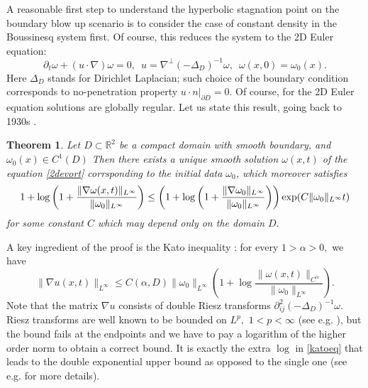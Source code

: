 \documentclass[reqno,centertags, 11pt]{amsart}
\newtheorem{theorem}{Theorem}[section]
\def \Rm {\mathbb R}
\begin{document}
A reasonable first step to understand the hyperbolic stagnation point on the boundary blow up scenario is to consider the case of constant
density in the Boussinesq system first. Of course, this reduces the system to the 2D Euler equation:
\begin{equation}\label{2devort}
\partial_t \omega + (u \cdot \nabla) \omega =0, \,\,\,u = \nabla^\perp(-\Delta_D)^{-1}\omega, \,\,\,\omega(x,0)= \omega_0(x).
\end{equation}
Here $\Delta_D$ stands for Dirichlet Laplacian; such choice of the boundary condition corresponds to no-penetration property $\left. u \cdot n \right|_{\partial D} =0.$
Of course, for the 2D Euler equation solutions are globally regular.
Let us state this result, going back to 1930s \cite{Wolibner,Holder}.
\begin{theorem}\label{upperb}
Let $D \subset \Rm^2$ be a compact domain with smooth boundary, and $\omega_0(x) \in C^1(D)$%
Then there exists a unique smooth solution $\omega(x,t)$ of the equation \eqref{2devort} corrsponding to the initial data $\omega_0$, which moreover satisfies
\begin{equation}\label{upperdexp}
1+\log\left(1+\frac{\|\nabla \omega(x,t)\|_{L^\infty}}{\|\omega_0\|_{L^\infty}}\right) \leq
\left(
1+\log\left(
1+
{
\|\nabla\omega_0\|_{L^\infty}
\over
\|\omega_0\|_{L^\infty}
}
\right)
\right)
\exp(
C\|\omega_0\|_{L^\infty}t
)
\end{equation}
for some constant $C$ which may depend only on the domain $D.$
\end{theorem}

A key ingredient of the proof is the Kato inequality \cite{Kato}: for every $1>\alpha>0,$ we have
\begin{equation}\label{katoeq}
\|\nabla u(x,t)\|_{L^\infty} \leq C(\alpha,D) \|\omega_0\|_{L^\infty}\left(1+\log \frac{\|\omega(x,t)\|_{C^\alpha}}{\|\omega_0\|_{L^\infty}} \right).
\end{equation}
Note that the matrix $\nabla u$ consists of double Riesz transforms $\partial^2_{ij}(-\Delta_D)^{-1} \omega.$ Riesz transforms
are well known to be bounded on $L^p,$ $1< p < \infty$ (see e.g. \cite{Stein}), but the bound fails at the endpoints and we have
to pay a logarithm of the higher order norm to obtain a correct bound. It is exactly the extra $\log$ in \eqref{katoeq} that leads
to the double exponential upper bound as opposed to the single one (see e.g. \cite{KS} for more details).
\end{document}
